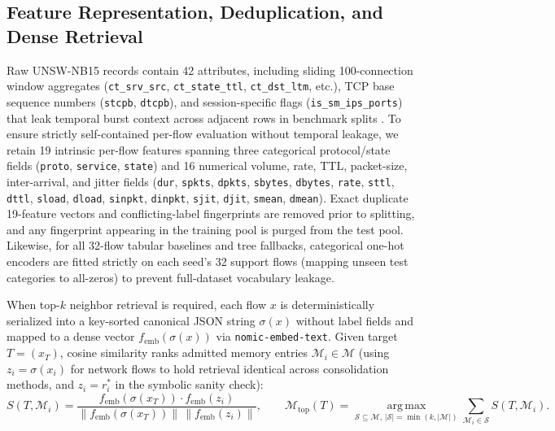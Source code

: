 \documentclass[11pt,letterpaper,onecolumn]{article}
\begin{document}
\subsection{Feature Representation, Deduplication, and Dense Retrieval}
\label{sec:features_retrieval}
Raw UNSW-NB15 records contain 42 attributes, including sliding 100-connection window aggregates (\texttt{ct\_srv\_src}, \texttt{ct\_state\_ttl}, \texttt{ct\_dst\_ltm}, etc.), TCP base sequence numbers (\texttt{stcpb}, \texttt{dtcpb}), and session-specific flags (\texttt{is\_sm\_ips\_ports}) that leak temporal burst context across adjacent rows in benchmark splits \cite{arp2022dos}. To ensure strictly self-contained per-flow evaluation without temporal leakage, we retain 19 intrinsic per-flow features spanning three categorical protocol/state fields (\texttt{proto}, \texttt{service}, \texttt{state}) and 16 numerical volume, rate, TTL, packet-size, inter-arrival, and jitter fields (\texttt{dur}, \texttt{spkts}, \texttt{dpkts}, \texttt{sbytes}, \texttt{dbytes}, \texttt{rate}, \texttt{sttl}, \texttt{dttl}, \texttt{sload}, \texttt{dload}, \texttt{sinpkt}, \texttt{dinpkt}, \texttt{sjit}, \texttt{djit}, \texttt{smean}, \texttt{dmean}). Exact duplicate 19-feature vectors and conflicting-label fingerprints are removed prior to splitting, and any fingerprint appearing in the training pool is purged from the test pool. Likewise, for all 32-flow tabular baselines and tree fallbacks, categorical one-hot encoders are fitted strictly on each seed's 32 support flows (mapping unseen test categories to all-zeros) to prevent full-dataset vocabulary leakage.

When top-$k$ neighbor retrieval is required, each flow $x$ is deterministically serialized into a key-sorted canonical JSON string $\sigma(x)$ without label fields and mapped to a dense vector $f_{\mathrm{emb}}(\sigma(x))$ via \texttt{nomic-embed-text}. Given target $T=(x_T)$, cosine similarity ranks admitted memory entries $\mathcal{M}_i \in \mathcal{M}$ (using $z_i = \sigma(x_i)$ for network flows to hold retrieval identical across consolidation methods, and $z_i = r_i^*$ in the symbolic sanity check):
\begin{equation}
\label{eq:top_k}
    S(T, \mathcal{M}_i) = \frac{f_{\mathrm{emb}}(\sigma(x_T)) \cdot f_{\mathrm{emb}}(z_i)}{\|f_{\mathrm{emb}}(\sigma(x_T))\| \, \|f_{\mathrm{emb}}(z_i)\|}, \qquad
    \mathcal{M}_{\mathrm{top}}(T) = \operatorname*{arg\,max}_{\mathcal{S} \subseteq \mathcal{M},\, |\mathcal{S}|=\min(k,|\mathcal{M}|)} \sum_{\mathcal{M}_i \in \mathcal{S}} S(T, \mathcal{M}_i).
\end{equation}
\end{document}

